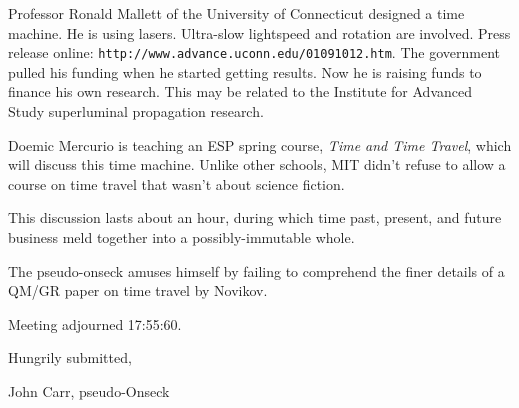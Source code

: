 \documentclass[12pt]{article}
\begin{document}
Professor Ronald Mallett of the University of Connecticut designed a
time machine.  He is using lasers.  Ultra-slow lightspeed and rotation
are involved.  Press release online:
{\tt http://www.advance.uconn.edu/01091012.htm}.
The government pulled his funding when he started getting results.
Now he is raising funds to finance his own research.
This may be related to the Institute for Advanced Study superluminal
propagation research.

Doemic Mercurio is teaching an ESP spring course, {\em Time and Time Travel},
which will discuss this time machine.  Unlike other schools, MIT didn't
refuse to allow a course on time travel that wasn't about science fiction.

This discussion lasts about an hour, during which time past, present,
and future business meld together into a possibly-immutable whole.

The pseudo-onseck amuses himself by failing to comprehend the finer
details of a QM/GR paper on time travel by Novikov.

\vspace{12pt}

\noindent
Meeting adjourned 17:55:60.

\vspace{18pt}

\centerline{Hungrily submitted,}
\centerline{John Carr, pseudo-Onseck}
\end{document}
